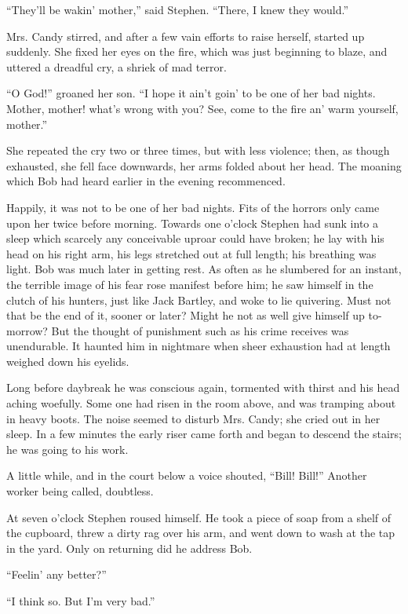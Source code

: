 ``They'll be wakin' mother,'' said Stephen. ``There, I knew they
would.''

Mrs. Candy stirred, and after a few vain efforts to raise herself,
started up suddenly. She fixed her eyes on the fire, which was just
beginning to blaze, and uttered a dreadful cry, a shriek of mad terror.

``O God!'' groaned her son. ``I hope it ain't goin' to be one of her bad
nights. Mother, mother! what's wrong with you? See, come to the fire an'
warm yourself, mother.''

She repeated the cry two or three times, but with less violence; then,
as though exhausted, she fell face downwards, her arms folded about her
head. The moaning which Bob had heard earlier in the evening
recommenced.

Happily, it was not to be one of her bad nights. Fits of the horrors
only came upon her twice before morning. Towards one o'clock Stephen had
sunk into a sleep which scarcely any conceivable uproar could have
broken; he {}lay with his head on his right arm, his legs stretched out
at full length; his breathing was light. Bob was much later in getting
rest. As often as he slumbered for an instant, the terrible image of his
fear rose manifest before him; he saw himself in the clutch of his
hunters, just like Jack Bartley, and woke to lie quivering. Must not
that be the end of it, sooner or later? Might he not as well give
himself up to-morrow? But the thought of punishment such as his crime
receives was unendurable. It haunted him in nightmare when sheer
exhaustion had at length weighed down his eyelids.

Long before daybreak he was conscious again, tormented with thirst and
his head aching woefully. Some one had risen in the room above, and was
tramping about in heavy boots. The noise seemed to disturb Mrs. Candy;
she cried out in her sleep. In a few minutes the early riser came forth
and began to descend the stairs; he was going to his work.

A little while, and in the court below a voice shouted, ``Bill! Bill!''
Another worker being called, doubtless.

At seven o'clock Stephen roused himself. {}He took a piece of soap from
a shelf of the cupboard, threw a dirty rag over his arm, and went down
to wash at the tap in the yard. Only on returning did he address Bob.

``Feelin' any better?''

``I think so. But I'm very bad.''

